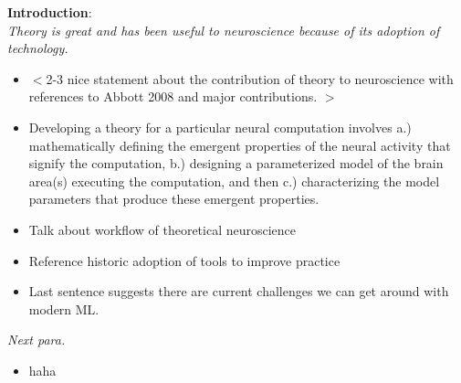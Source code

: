 \documentclass[11pt]{article}
\begin{document}
\textbf{Introduction}: \\
\textit{Theory is great and has been useful to neuroscience because of its adoption of technology.}
\begin{itemize} 
\item $<$2-3 nice statement about the contribution of theory to neuroscience with references to Abbott 2008 and major contributions. $>$ 
\item Developing a theory for a particular neural computation involves a.) mathematically defining the emergent properties of the neural activity that signify the computation, b.) designing a parameterized model of the brain area(s) executing the computation, and then c.) characterizing the model parameters that produce these emergent properties. 
\item Talk about workflow of theoretical neuroscience
\item Reference historic adoption of tools to improve practice
\item Last sentence suggests there are current challenges we can get around with modern ML.
\end{itemize}

\textit{Next para.}
\begin{itemize} 
\item haha
\end{itemize}





\end{document}

